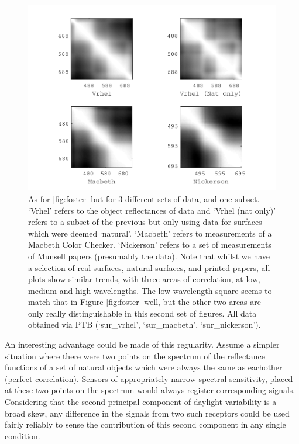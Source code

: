 \begin{figure}[htbp]
 \includegraphics[max width=\textwidth]{figs/comp/nat_cor/others.pdf}
 \caption{As for \ref{fig:foster} but for 3 different sets of data, and one subset. `Vrhel' refers to the object reflectances of \citet{vrhel_measurement_1994} data and `Vrhel (nat only)' refers to a subset of the previous but only using data for surfaces which were deemed `natural'. `Macbeth' refers to measurements of a Macbeth Color Checker. `Nickerson' refers to a set of measurements of Munsell papers (presumably the \citet{kelly_tristimulus_1943} data). Note that whilst we have a selection of real surfaces, natural surfaces, and printed papers, all plots show similar trends, with three areas of correlation, at low, medium and high wavelengths. The low wavelength square seems to match that in Figure \ref{fig:foster} well, but the other two areas are only really distinguishable in this second set of figures. All data obtained via \gls{PTB} (`sur\_vrhel', `sur\_macbeth', `sur\_nickerson').}
 \label{fig:others}
\end{figure} 

An interesting advantage could be made of this regularity. Assume a simpler situation where there were two points on the spectrum of the reflectance functions of a set of natural objects which were always the same as eachother (perfect correlation). Sensors of appropriately narrow spectral sensitivity, placed at these two points on the spectrum would always register corresponding signals. Considering that the second principal component of daylight variability is a broad skew, any difference in the signals from two such receptors could be used fairly reliably to sense the contribution of this second component in any single condition. 

